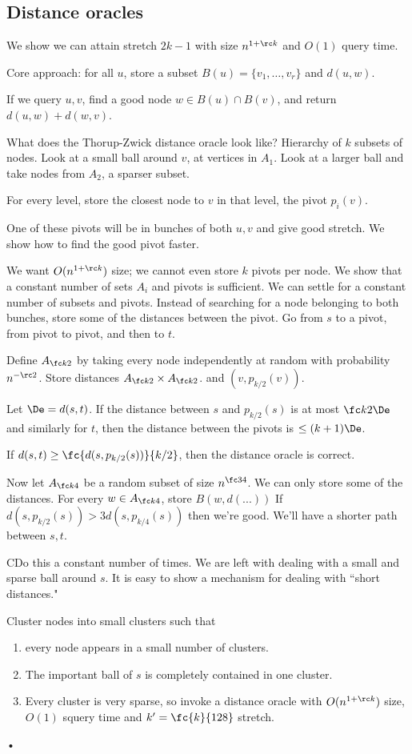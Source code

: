 \subsection{Distance oracles}

We show we can attain stretch $2k-1$ with size $n^{1+\rc k}$ and $O(1)$ query time.

Core approach: for all $u$, store a subset $B(u)=\{v_1,\ldots, v_r\}$ and $d(u,w)$.

If we query $u,v$, find a good node $w\in B(u)\cap B(v)$, and return $d(u,w)+d(w,v)$.

What does the Thorup-Zwick distance oracle look like? 
Hierarchy of $k$ subsets of nodes. 
Look at a small ball around $v$, at vertices in $A_1$. Look at a larger ball and take nodes from $A_2$, a sparser subset. 

For every level, store the closest node to $v$ in that level, the pivot $p_i(v)$.

One of these pivots will be in bunches of both $u,v$ and give good stretch. We show how to find the good pivot faster.

We want $O(n^{1+\rc k})$ size; we cannot even store $k$ pivots per node. We show that a constant number of sets $A_i$ and pivots is sufficient.
We can settle for a constant number of subsets and pivots. Instead of searching for a node belonging to both bunches, store some of the distances between the pivot. Go from $s$ to a pivot, from pivot to pivot, and then to $t$. 

Define $A_{\fc k2}$ by taking every node independently at random with probability $n^{-\rc2}$. Store distances $A_{\fc k2}\times A_{\fc k2}$. and $(v,p_{k/2}(v))$.

Let $\De=d(s,t)$. If the distance between $s$ and $p_{k/2}(s)$ is at most $\fc k2\De$ and similarly for $t$, then the distance between the pivots is $\le (k+1)\De$.

If $d(s,t)\ge \fc{d(s,p_{k/2}(s))}{k/2}$, then the distance oracle is correct.

Now let $A_{\fc k4}$ be a random subset of size $n^{\fc 34}$. We can only store some of the distances. For every $w\in A_{\fc k4}$, store $B(w,d(...))$ If $d(s,p_{k/2}(s))> 3d(s,p_{k/4}(s))$ then we're good. We'll have a shorter path between $s,t$.

CDo this a constant number of times. We are left with dealing with a small and sparse ball around $s$. It is easy to show a mechanism for dealing with ``short distances."

Cluster nodes into small clusters such that 
\begin{enumerate}
\item
every node appears in a small number of clusters.
\item
The important ball of $s$ is completely contained in one cluster.
\item
Every cluster is very sparse, so invoke a distance oracle with $O(n^{1+\rc k})$ size, $O(1)$ squery time and $k'=\fc{k}{128}$ stretch.
\end{enumerate}•

